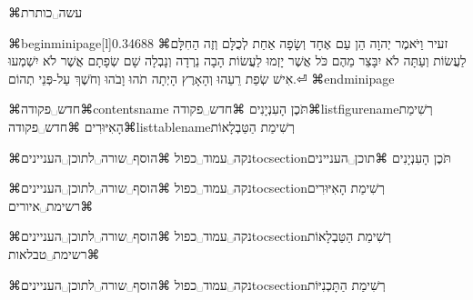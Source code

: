⌘עשה␣כותרת



\hfill
\archaic
⌘begin{minipage}[l]{0.34688\textwidth}
⌘זעיר
וַיֹּאמֶר יְהוָה הֵן עַם אֶחָד וְשָׂפָה אַחַת לְכֻלָּם וְזֶה הַחִלָּם
לַעֲשׂוֹת וְעַתָּה לֹא יִבָּצֵר מֵהֶם כֹּל אֲשֶׁר יָזְמוּ לַעֲשׂוֹת
הָבָה נֵרְדָה וְנָבְלָה שָׁם שְׂפָתָם אֲשֶׁר לֹא יִשְׁמְעוּ אִישׁ שְׂפַת
רֵעֵהוּ וְהָאָרֶץ הָיְתָה תֹהוּ וָבֹהוּ וְחֹשֶׁךְ עַל-פְּנֵי תְהוֹם.⏎
⌘end{minipage}
\modern
\phrase

⌘חדש␣פקודה⌘contentsname{
  תֹּכֶן הָעִנְיָנִים
}
⌘חדש␣פקודה⌘listfigurename{רְשִׁימַת הָאִיּוּרִים}
⌘חדש␣פקודה⌘listtablename{רְשִׁימַת הַטַּבְלָאוֹת}  

⌘נקה␣עמוד␣כפול
⌘הוסף␣שורה␣לתוכן␣העניינים{toc}{section}{תֹּכֶן הָעִנְיָנִים}
⌘תוכן␣העניינים

⌘נקה␣עמוד␣כפול
⌘הוסף␣שורה␣לתוכן␣העניינים{toc}{section}{רְשִׁימַת הָאִיּוּרִים}
⌘רשימת␣איורים

⌘נקה␣עמוד␣כפול
⌘הוסף␣שורה␣לתוכן␣העניינים{toc}{section}{רְשִׁימַת הַטַּבְלָאוֹת}
⌘רשימת␣טבלאות

⌘נקה␣עמוד␣כפול
⌘הוסף␣שורה␣לתוכן␣העניינים{toc}{section}{רְשִׁימַת הַתָּכְנִיּוֹת}



